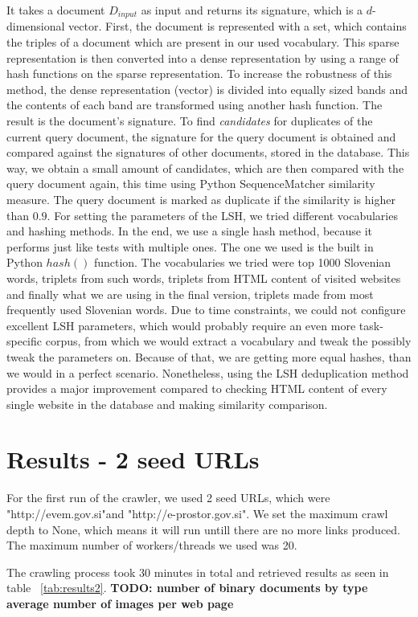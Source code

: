 \documentclass[9pt]{IEEEtran}
\begin{document}
It takes a document $D_{input}$ as input and returns its signature, which is a $d$-dimensional vector.
First, the document is represented with a set, which contains the triples of a document which are present in our used vocabulary.
This sparse representation is then converted into a dense representation by using a range of hash functions on the sparse representation.
To increase the robustness of this method, the dense representation (vector) is divided into equally sized bands and the contents of each band are transformed using another hash function.
The result is the document's signature.
To find \textit{candidates} for duplicates of the current query document, the signature for the query document is obtained and compared against the signatures of other documents, stored in the database.
This way, we obtain a small amount of candidates, which are then compared with the query document again, this time using Python SequenceMatcher similarity measure.
The query document is marked as duplicate if the similarity is higher than $0.9$.
For setting the parameters of the LSH, we tried different vocabularies and hashing methods. 
In the end, we use a single hash method, because it performs just like tests with multiple ones.
The one we used is the built in Python $hash()$ function.
The vocabularies we tried were top 1000 Slovenian words, triplets from such words, triplets from HTML content of visited websites and finally what we are using in the final version, triplets made from most frequently used Slovenian words. 
Due to time constraints, we could not configure excellent LSH parameters, which would probably require an even more task-specific corpus, from which we would extract a vocabulary and tweak the possibly tweak the parameters on.
Because of that, we are getting more equal hashes, than we would in a perfect scenario.
Nonetheless, using the LSH deduplication method provides a major improvement compared to checking HTML content of every single website in the database and making similarity comparison.


\section{Results - 2 seed URLs}
For the first run of the crawler, we used 2 seed URLs, which were "http://evem.gov.si"and "http://e-prostor.gov.si". We set the maximum crawl depth to None, which means it will run untill there are no more links produced. The maximum number of workers/threads we used was 20.

The crawling process took 30 minutes in total and retrieved results as seen in table ~\ref{tab:results2}.
\textbf{TODO: number of binary documents by type
average number of images per web page}
\end{document}
